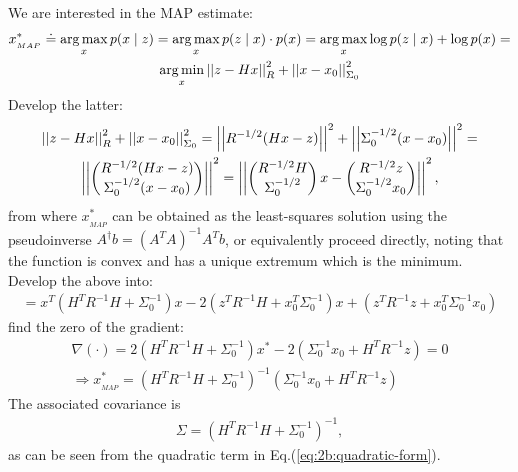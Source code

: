 \documentclass[a4paper]{scrreprt}
\begin{document}
\section{}
We are interested in the MAP estimate: 
\begin{gather}
	x^{\ast}_{_{MAP}}\doteq \operatorname*{{\arg \max}}_x p(x\mid z) = \operatorname*{{\arg \max}}_x p(z\mid 
	x)\cdot p(x) 
	= \operatorname*{{\arg \max}}_x \log 
	p(z\mid x) + \log p(x) = \\
	\operatorname*{{\arg \min}}_x \left|\left|z-Hx\right|\right|^2_{R} + 
	\left|\left|x-x_0\right|\right|^2_{\Sigma_0}
\end{gather}
Develop the latter: 
\begin{gather}
	\left|\left|z-Hx\right|\right|^2_{R} + 
		\left|\left|x-x_0\right|\right|^2_{\Sigma_0} = 	\left|\left|R^{-1/2}(Hx-z)\right|\right|^2 + 
				\left|\left|\Sigma_0^{-1/2}(x-x_0)\right|\right|^2 = \\
			\left|\left|\begin{pmatrix}
			R^{-1/2}(Hx-z) \\
			\Sigma_0^{-1/2}(x-x_0)
			\end{pmatrix}\right|\right|^2  = 
			\left|\left|\begin{pmatrix}
						R^{-1/2}H \\
						\Sigma_0^{-1/2}
						\end{pmatrix} x - \begin{pmatrix}
						R^{-1/2}z \\ \Sigma_0^{-1/2}x_0
						\end{pmatrix}\right|\right|^2, 
\end{gather}
from where $x^{\ast}_{_{MAP}}$ can be obtained as the least-squares solution 
using the pseudoinverse 
$A^\dagger b=(A^TA)^{-1}A^Tb$, or equivalently proceed directly, noting that 
the 
function 
is convex 
and has a unique extremum which is the minimum. Develop the above into: 
\begin{gather}	
		= x^T\left(H^TR^{-1}H+\Sigma_0^{-1}\right)x 
		-2\left(z^TR^{-1}H+x_0^T\Sigma_0^{-1}\right)x + 
		\left(z^TR^{-1}z+x_0^T\Sigma_0^{-1}x_0\right)
		\label{eq:2b:quadratic-form}
\end{gather}
find the zero of the gradient: 
\begin{gather}
	\nabla (\cdot) = 
	2\left(H^TR^{-1}H+\Sigma_0^{-1}\right)x^\ast-2\left(\Sigma_0^{-1}x_0+H^TR^{-1}z\right)
	 =0 \\
	\Longrightarrow \boxed{x^\ast_{_{MAP}} = 
	\left(H^TR^{-1}H+\Sigma_0^{-1}\right)^{-1}\left(\Sigma_0^{-1}x_0+H^TR^{-1}z\right)}
\end{gather}
The associated covariance is
\begin{gather}
	\boxed{\Sigma=\left(H^TR^{-1}H+\Sigma_0^{-1}\right)^{-1}},
\end{gather}
 as can be seen from the quadratic term in 
Eq.(\ref{eq:2b:quadratic-form}). 
\end{document}
